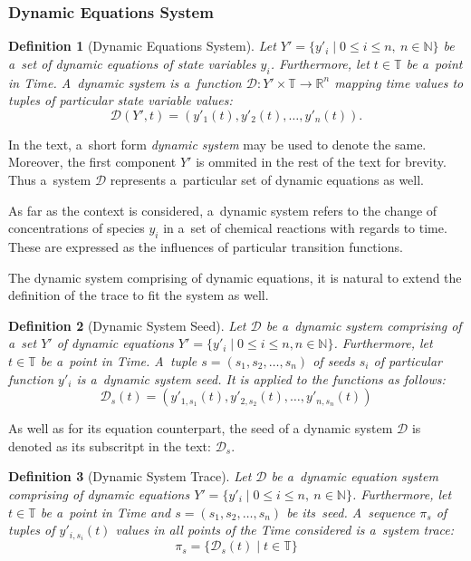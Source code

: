 \documentclass[12pt,oneside,draft]{fithesis}
\newcommand{\mD}{\mathcal{D}}
\newcommand{\mReal}{\mathbb{R}}
\newcommand{\mNatural}{\mathbb{N}}
\newcommand{\mTime}{\mathbb{T}}
\newtheorem{mydef}{Definition}
\begin{document}
\subsubsection{Dynamic Equations System}
\begin{mydef}[Dynamic Equations System]
Let $Y'=\{y'_i\mid 0\leq{}i\leq{}n,\:n\in\mNatural\}$ be a~set of dynamic
equations of state variables $y_i$.
Furthermore, let $t\in\mTime$ be a~point in Time.
A~dynamic system is a~function
$\mD:Y'\times\mTime\rightarrow\mReal^n$ mapping
time values to tuples of particular state variable values:
	\begin{equation}
		\mD(Y',t)=(y'_{1}(t),y'_{2}(t),\dotsc,y'_{n}(t)).
	\end{equation}
\end{mydef}
In the text, a~short form \emph{dynamic system} may be used to denote
the same. Moreover, the first component $Y'$ is ommited in
the rest of the text for brevity. Thus a~system $\mD$
represents a~particular set of dynamic equations as well.

As far as the context is considered, a~dynamic system refers
to the change of concentrations of species $y_i$ in a~set of chemical
reactions with regards to time. These are expressed as the influences
of particular transition functions.

The dynamic system comprising of dynamic equations, it is natural to
extend the definition of the trace to fit the system as well.

\begin{mydef}[Dynamic System Seed]
Let $\mD$ be a~dynamic system comprising of a~set $Y'$ of dynamic
equations $Y'=\{y'_i\mid 0\leq{}i\leq{}n,n\in\mNatural\}$.
Furthermore, let $t\in\mTime$ be a~point in Time.
A~tuple $s=(s_1,s_2,\dotsc,s_n)$ of seeds $s_i$ of particular
function $y'_i$ is a~dynamic system seed. It is applied to the functions
as follows:
	\begin{equation}
		\mD_s{}(t)=(y'_{1,s_1}(t),y'_{2,s_2}(t),\dotsc{},y'_{n,s_n}(t))
	\end{equation}
\end{mydef}
As well as for its equation counterpart, the seed of a dynamic system
$\mD$ is denoted as its subscritpt in the text: $\mD_s$.

\begin{mydef}[Dynamic System Trace]
Let $\mD$ be a~dynamic equation system comprising of dynamic equations
$Y'=\{y'_i\mid 0\leq{}i\leq{}n,\:n\in\mNatural\}$. Furthermore, let
$t\in\mTime$ be a~point in Time and $s=(s_1,s_2,\dotsc,s_n)$ be
its~seed. A~sequence $\pi_s$ of tuples of $y'_{i,s_i}(t)$ values in all
points of the Time considered is a~system trace:
	\begin{equation}
		\pi_s=\{\mD_s{}(t)\mid t\in\mTime\}
	\end{equation}
\end{mydef}
\end{document}
